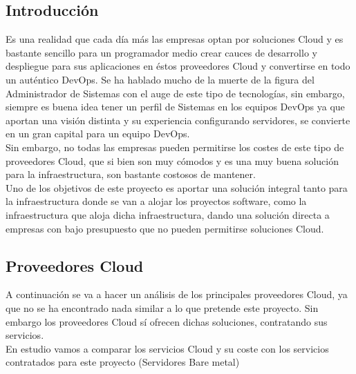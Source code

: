 	\subsection{Introducción}
		\begin{paragraph}
			Es una realidad que cada día más las empresas optan por soluciones Cloud y es bastante sencillo para un programador medio crear cauces de desarrollo y despliegue para sus aplicaciones en éstos proveedores Cloud y convertirse en todo un auténtico DevOps. Se ha hablado mucho de la muerte de la figura del Administrador de Sistemas con el auge de este tipo de tecnologías, sin embargo, siempre es buena idea tener un perfil de Sistemas en los equipos DevOps ya que aportan una visión distinta y su experiencia configurando servidores, se convierte en un gran capital para un equipo DevOps. \\ 
			Sin embargo, no todas las empresas pueden permitirse los costes de este tipo de proveedores Cloud, que si bien son muy cómodos y es una muy buena solución para la infraestructura, son bastante costosos de mantener. \\
			Uno de los objetivos de este proyecto es aportar una solución integral tanto para la infraestructura donde se van a alojar los proyectos software, como la infraestructura que aloja dicha infraestructura, dando una solución directa a empresas con bajo presupuesto que no pueden permitirse soluciones Cloud. \\
		\end{paragraph}
	
	\subsection{Proveedores Cloud}
		\begin{paragraph}
			A continuación se va a hacer un análisis de los principales proveedores Cloud, ya que no se ha encontrado nada similar a lo que pretende este proyecto. Sin embargo los proveedores Cloud sí ofrecen dichas soluciones, contratando sus servicios. \\
			En estudio vamos a comparar los servicios Cloud y su coste con los servicios contratados para este proyecto (Servidores Bare metal) \\
		\end{paragraph}
	
